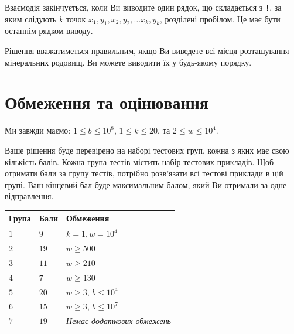 Взаємодія закінчується, коли Ви виводите один рядок, що складається з \texttt{!}, за яким слідують $k$ точок $x_1, y_1, x_2, y_2, \ldots x_k, y_k$, розділені пробілом.
Це має бути останнім рядком виводу.

Рішення вважатиметься правильним, якщо Ви виведете всі місця розташування мінеральних родовищ.
Ви можете виводити їх у будь-якому порядку.

\section*{Обмеження та оцінювання}

Ми завжди маємо:
$1\leq b \leq 10^8$, %
$1 \leq k \leq 20$, %
та
$2 \le w \le 10^4$. %

Ваше рішення буде перевірено на наборі тестових груп, кожна з яких має свою кількість балів.
Кожна група тестів містить набір тестових прикладів.
Щоб отримати бали за групу тестів, потрібно розв'язати всі тестові приклади в цій групі.
Ваш кінцевий бал буде максимальним балом, який Ви отримали за одне відправлення.

\medskip
\begin{tabular}{lll}
Група & Бали & Обмеження \\\hline
  $1$ & $9$ & $k = 1, w = 10^4$\\
  $2$ & $19$ & $w \ge 500$\\
  $3$ & $11$ & $w \ge 210$\\
  $4$ & $7$ & $w \ge 130$\\
  $5$ & $20$ & $w \ge 3$, $b \le 10^4$\\
  $6$ & $15$ & $w \ge 3$, $b \le 10^7$\\
  $7$ & $19$ & \emph{Немає додаткових обмежень}
\end{tabular}

